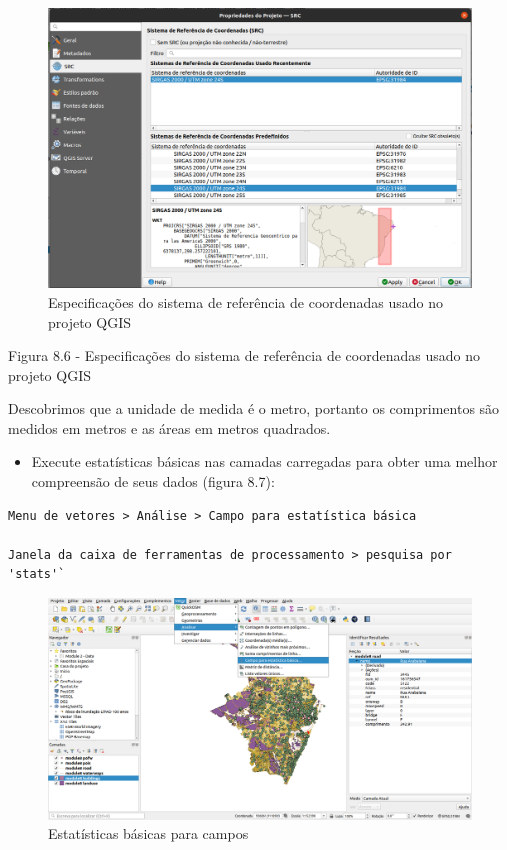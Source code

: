 \documentclass[
]{krantz}
\providecommand{\tightlist}{%
  \setlength{\itemsep}{0pt}\setlength{\parskip}{0pt}}
\begin{document}
\begin{figure}
\centering
\includegraphics{media/modulo8/fig86.png}
\caption{Especificações do sistema de referência de coordenadas usado no projeto QGIS}
\end{figure}

Figura 8.6 - Especificações do sistema de referência de coordenadas usado no projeto QGIS

Descobrimos que a unidade de medida é o metro, portanto os comprimentos são medidos em metros e as áreas em metros quadrados.

\begin{itemize}
\tightlist
\item
  Execute estatísticas básicas nas camadas carregadas para obter uma melhor compreensão de seus dados (figura 8.7):
\end{itemize}

\begin{verbatim}
Menu de vetores > Análise > Campo para estatística básica

Janela da caixa de ferramentas de processamento > pesquisa por 'stats'`
\end{verbatim}

\begin{figure}
\centering
\includegraphics{media/modulo8/fig87.png}
\caption{Estatísticas básicas para campos}
\end{figure}
\end{document}

